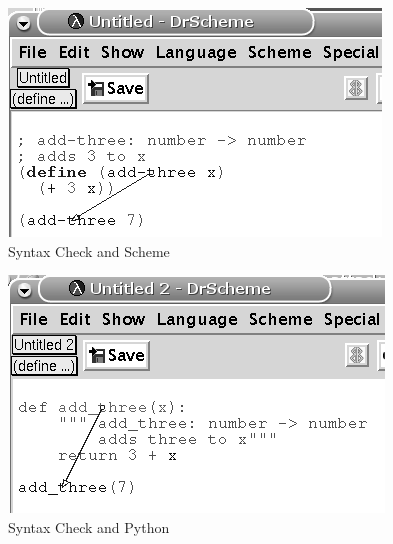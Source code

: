 \begin{figure}
	\caption{Syntax Check and Scheme}
	\label{syntaxcheckschemefig}
	\begin{center}
		\includegraphics{images/syntax-check-scheme}
	\end{center}
\end{figure}

\begin{figure}
	\caption{Syntax Check and Python}
	\label{syntaxcheckpythonfig}
	\begin{center}
		\includegraphics{images/syntax-check-python}
	\end{center}
\end{figure}

